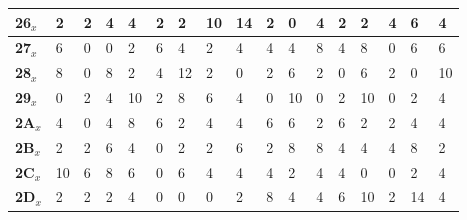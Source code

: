 \begin{longtable}[c]{|l|l|l|l|l|l|l|l|l|l|l|l|l|l|l|l|l|}
\textbf{26$_x$} & 2              & 2              & 4              & 4              & 2              & 2              & 10             & 14             & 2              & 0              & 4              & 2              & 2              & 4              & 6              & 4              \\ \hline
\textbf{27$_x$} & 6              & 0              & 0              & 2              & 6              & 4              & 2              & 4              & 4              & 4              & 8              & 4              & 8              & 0              & 6              & 6              \\ \hline
\textbf{28$_x$} & 8              & 0              & 8              & 2              & 4              & 12             & 2              & 0              & 2              & 6              & 2              & 0              & 6              & 2              & 0              & 10             \\ \hline
\textbf{29$_x$} & 0              & 2              & 4              & 10             & 2              & 8              & 6              & 4              & 0              & 10             & 0              & 2              & 10             & 0              & 2              & 4              \\ \hline
\textbf{2A$_x$} & 4              & 0              & 4              & 8              & 6              & 2              & 4              & 4              & 6              & 6              & 2              & 6              & 2              & 2              & 4              & 4              \\ \hline
\textbf{2B$_x$} & 2              & 2              & 6              & 4              & 0              & 2              & 2              & 6              & 2              & 8              & 8              & 4              & 4              & 4              & 8              & 2              \\ \hline
\textbf{2C$_x$} & 10             & 6              & 8              & 6              & 0              & 6              & 4              & 4              & 4              & 2              & 4              & 4              & 0              & 0              & 2              & 4              \\ \hline
\textbf{2D$_x$} & 2              & 2              & 2              & 4              & 0              & 0              & 0              & 2              & 8              & 4              & 4              & 6              & 10             & 2              & 14             & 4              \\ \hline

\end{longtable}
